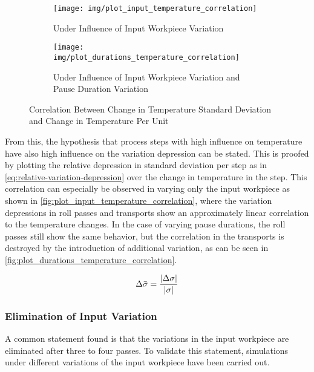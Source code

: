 \begin{figure}
    \begin{subfigure}{\linewidth}
        \centering
        \texttt{[image: img/plot\_input\_temperature\_correlation]}
        \caption{Under Influence of Input Workpiece Variation}
        \label{fig:plot_input_temperature_correlation}
    \end{subfigure}
    \begin{subfigure}{\linewidth}
        \centering
        \texttt{[image: img/plot\_durations\_temperature\_correlation]}
        \caption{Under Influence of Input Workpiece Variation and Pause Duration Variation}
        \label{fig:plot_durations_temperature_correlation}
    \end{subfigure}
    \caption{Correlation Between Change in Temperature Standard Deviation and Change in Temperature Per Unit}
\end{figure}

From this, the hypothesis that process steps with high influence on temperature have also high influence on the variation depression can be stated.
This is proofed by plotting the relative depression in standard deviation per step as in \autoref{eq:relative-variation-depression} over the change in temperature in the step.
This correlation can especially be observed in varying only the input workpiece as shown in \autoref{fig:plot_input_temperature_correlation}, where the variation depressions in roll passes and transports show an approximately linear correlation to the temperature changes.
In the case of varying pause durations, the roll passes still show the same behavior, but the correlation in the transports is destroyed by the introduction of additional variation, as can be seen in \autoref{fig:plot_durations_temperature_correlation}.

\begin{equation}
    {\Delta\bar{\sigma}} = \frac{{\lvert {\Delta {\sigma}} \rvert}}{{\lvert {\sigma} \rvert}}
    \label{eq:relative-variation-depression}
\end{equation}


\subsubsection{Elimination of Input Variation}\label{subsubsec:elimination-of-input-variation}

A common statement found is that the variations in the input workpiece are eliminated after three to four passes.
To validate this statement, simulations under different variations of the input workpiece have been carried out.

